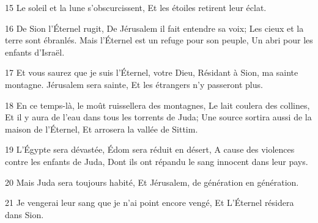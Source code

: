 \par 15 Le soleil et la lune s'obscurcissent, Et les étoiles retirent leur éclat.
\par 16 De Sion l'Éternel rugit, De Jérusalem il fait entendre sa voix; Les cieux et la terre sont ébranlés. Mais l'Éternel est un refuge pour son peuple, Un abri pour les enfants d'Israël.
\par 17 Et vous saurez que je suis l'Éternel, votre Dieu, Résidant à Sion, ma sainte montagne. Jérusalem sera sainte, Et les étrangers n'y passeront plus.
\par 18 En ce temps-là, le moût ruissellera des montagnes, Le lait coulera des collines, Et il y aura de l'eau dans tous les torrents de Juda; Une source sortira aussi de la maison de l'Éternel, Et arrosera la vallée de Sittim.
\par 19 L'Égypte sera dévastée, Édom sera réduit en désert, A cause des violences contre les enfants de Juda, Dont ils ont répandu le sang innocent dans leur pays.
\par 20 Mais Juda sera toujours habité, Et Jérusalem, de génération en génération.
\par 21 Je vengerai leur sang que je n'ai point encore vengé, Et L'Éternel résidera dans Sion.


